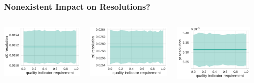 \documentclass[18pt, aspectratio=169]{beamer}
\begin{document}
\begin{frame}
  \frametitle{Nonexistent Impact on Resolutions?}
  \begin{columns}
    \begin{column}{.33\textwidth}
      \centering
      \includegraphics[width=\textwidth]{figures/combined-qi/d0_resolution.pdf}
    \end{column}
    \begin{column}{.33\textwidth}
      \centering
      \includegraphics[width=\textwidth]{figures/combined-qi/z0_resolution.pdf}
    \end{column}
    \begin{column}{.33\textwidth}
      \centering
      \includegraphics[width=\textwidth]{figures/combined-qi/pt_resolution.pdf}

\end{column}
\end{columns}
\end{frame}
\end{document}
